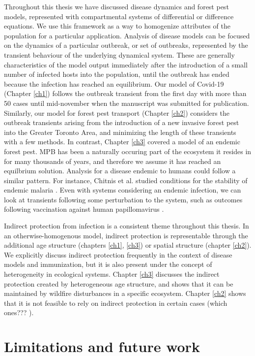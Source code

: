Throughout this thesis we have discussed disease dynamics and forest pest models, represented with compartmental systems of differential or difference equations. We use this framework as a way to homogenize attributes of the population for a particular application. Analysis of disease models can be focused on the dynamics of a particular outbreak, or set of outbreaks, represented by the transient behaviour of the underlying dynamical system. These are generally characteristics of the model output immediately after the introduction of a small number of infected hosts into the population, until the outbreak has ended because the infection has reached an equilibrium. Our model of Covid-19 (Chapter \ref{ch1}) follows the outbreak transient from the first day with more than 50 cases until mid-november when the manuscript was submitted for publication. Similarly, our model for forest pest transport (Chapter \ref{ch2}) considers the outbreak transients arising from the introduction of a new invasive forest pest into the Greater Toronto Area, and minimizing the length of these transients with a few methods. In contrast, Chapter \ref{ch3} covered a model of an endemic forest pest. MPB has been a naturally occuring part of the ecosystem it resides in for many thousands of years, and therefore we assume it has reached an equilbrium solution. Analysis for a disease endemic to humans could follow a similar pattern. For instance, Chitnis et al. studied conditions for the stability of endemic malaria \cite{chitnis2006bifurcation}. Even with systems considering an endemic infection, we can look at transients following some perturbation to the system, such as outcomes following vaccination against human papillomavirus \cite{lee2012mathematical}. 

Indirect protection from infection is a consistent theme throughout this thesis. In an otherwise-homogenous model, indirect protection is representable through the additional age structure (chapters \ref{ch1}, \ref{ch3}) or spatial structure (chapter \ref{ch2}). We explicitly discuss indirect protection frequently in the context of disease models and immunization, but it is also present under the concept of heterogeneity in ecological systems. Chapter \ref{ch3} discusses the indirect protection created by heterogeneous age structure, and shows that it can be maintained by  wildfire disturbances in a specific ecosystem. Chapter \ref{ch2} shows that it is not feasible to rely on indirect protection in certain cases (which ones??? ).   


\section{Limitations and future work}

